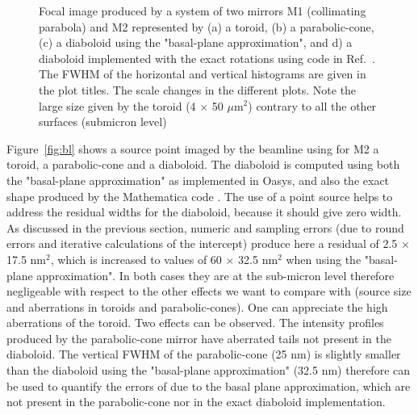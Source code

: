 \documentclass{iucr}              %
\begin{document}
\begin{figure}
\caption{Focal image produced by a system of two mirrors M1 (collimating parabola) and M2 represented by (a) a toroid, (b) a parabolic-cone, (c) a diaboloid using the "basal-plane approximation", and d) a diaboloid implemented with the exact rotations using code in Ref.~\cite{lacey}. The FWHM of the horizontal and vertical histograms are given in the plot titles. The scale changes in the different plots. Note the large size given by the toroid (4 $\times$ 50 $\mu$m$^2$) contrary to all the other surfaces (submicron level)
}
\end{figure}

Figure~\ref{fig:bl} shows a source point imaged by the beamline using for M2 a toroid, a parabolic-cone and a diaboloid. The diaboloid is computed using both the "basal-plane approximation" as implemented in Oasys, and also the exact shape produced by the Mathematica code \cite{lacey}. The use of a point source helps to address the residual widths for the diaboloid, because it should give zero width. As discussed in the previous section, numeric and sampling errors (due to round errors and iterative calculations of the intercept) produce here a residual of 2.5 $\times$ 17.5 nm$^2$, which is increased to values of 60 $\times$ 32.5 nm$^2$ when using the "basal-plane approximation". In both cases they are at the sub-micron level therefore negligeable with respect to the other effects we want to compare with (source size and aberrations in toroids and parabolic-cones). One can appreciate the high aberrations of the toroid. Two effects can be observed. The intensity profiles produced by the parabolic-cone mirror have aberrated tails not present in the diaboloid. The vertical FWHM of the parabolic-cone (25 nm) is slightly smaller than the diaboloid using the "basal-plane approximation" (32.5 nm) therefore can be used to quantify the errors of due to the basal plane approximation, which are not present in the parabolic-cone nor in the exact diaboloid implementation. 
\end{document}

